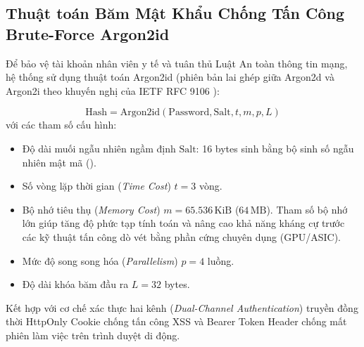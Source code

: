 \subsection{Thuật toán Băm Mật Khẩu Chống Tấn Công Brute-Force Argon2id}
\label{subsec:argon2id_security}

Để bảo vệ tài khoản nhân viên y tế và tuân thủ Luật An toàn thông tin mạng, hệ thống sử dụng thuật toán Argon2id (phiên bản lai ghép giữa Argon2d và Argon2i theo khuyến nghị của IETF RFC 9106 \cite{argon2id_rfc9106}):

\begin{equation}
    \text{Hash} = \text{Argon2id}(\text{Password}, \text{Salt}, t, m, p, L)
\end{equation}
với các tham số cấu hình:
\begin{itemize}[leftmargin=1.5em]
    \item Độ dài muối ngẫu nhiên ngầm định $\text{Salt}$: 16 bytes sinh bằng bộ sinh số ngẫu nhiên mật mã ().
    \item Số vòng lặp thời gian (\textit{Time Cost}) $t = 3$ vòng.
    \item Bộ nhớ tiêu thụ (\textit{Memory Cost}) $m = 65.536\,\text{KiB}$ ($64\,\text{MB}$). Tham số bộ nhớ lớn giúp tăng độ phức tạp tính toán và nâng cao khả năng kháng cự trước các kỹ thuật tấn công dò vét bằng phần cứng chuyên dụng (GPU/ASIC).
    \item Mức độ song song hóa (\textit{Parallelism}) $p = 4$ luồng.
    \item Độ dài khóa băm đầu ra $L = 32$ bytes.
\end{itemize}

Kết hợp với cơ chế xác thực hai kênh (\textit{Dual-Channel Authentication}) truyền đồng thời HttpOnly Cookie chống tấn công XSS và Bearer Token Header chống mất phiên làm việc trên trình duyệt di động.
